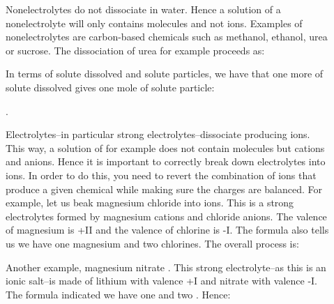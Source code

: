 \documentclass[main.tex]{subfiles}
\begin{document}
\begin{description}
\item[] Nonelectrolytes do not dissociate in water. Hence a solution of a nonelectrolyte will only contains molecules and not ions. Examples of nonelectrolytes are carbon-based chemicals such as methanol, ethanol, urea or sucrose. The dissociation of urea for example  proceeds as:
\begin{center}\end{center}
In terms of solute dissolved and solute particles, we have that one more of solute dissolved gives one mole of solute particle:
\begin{center}.\end{center}
\item[] Electrolytes--in particular strong electrolytes--dissociate producing ions. This way, a solution of for example  does not contain  molecules but  cations and  anions. Hence it is important to  correctly break down electrolytes into ions. In order to do this, you need to revert the combination of ions that produce a given chemical while making sure the charges are balanced. For example, let us beak magnesium chloride  into ions. This is a strong electrolytes formed by magnesium cations and chloride anions. The valence of magnesium is +II and the valence of chlorine is -I. The  formula also tells us we have one magnesium and two chlorines. The overall process is:
\begin{center}\end{center}
Another example, magnesium nitrate . This strong electrolyte--as this is an ionic salt--is made of lithium with valence +I and nitrate with valence -I. The formula indicated we have one  and two . Hence:
\begin{center}\end{center}


\end{description}
\end{document}
